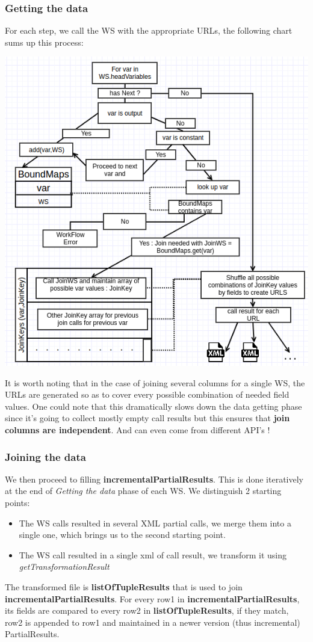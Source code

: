 \documentclass[11pt]{article}
\begin{document}
\subsubsection{Getting the data}
For each step, we call the WS with the appropriate URLs, the following chart sums up this process:
\begin{center}
\includegraphics[height=0.38\paperheight]{DataGetterFlowChart.png}
\end{center}
It is worth noting that in the case of joining several columns for a single WS, the URLs are generated so as to cover every possible combination of needed field values. One could note that this dramatically slows down the data getting phase since it's going to collect mostly empty call results but this ensures that \textbf{join columns are independent}. And can even come from different API's !
\subsubsection{Joining the data}
We then proceed to filling \textbf{incrementalPartialResults}. This is done iteratively at the end of \textit{Getting the data} phase of each WS. We distinguish 2 starting points:
\begin{itemize}
\item The WS calls resulted in several XML partial calls, we merge them into a single one, which brings us to the second starting point.
\item The WS call resulted in a single xml of call result, we transform it using \textit{getTransformationResult}
\end{itemize}
The transformed file is \textbf{listOfTupleResults} that is used to join \textbf{incrementalPartialResults}. For every row1 in \textbf{incrementalPartialResults}, its fields are compared to every row2 in \textbf{listOfTupleResults}, if they match, row2 is appended to row1 and maintained in a newer version (thus incremental) PartialResults.
\end{document}
